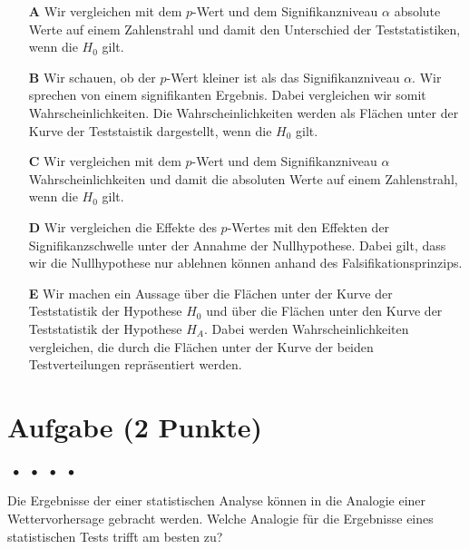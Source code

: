 \documentclass[a4paper, 9pt]{scrartcl}\usepackage[]{graphicx}\usepackage[]{xcolor}
\begin{document}
\begin{enumerate}
\item [\textbf{A} \msquare] Wir vergleichen mit dem $p$-Wert und dem Signifikanzniveau $\alpha$ absolute Werte auf einem Zahlenstrahl und damit den Unterschied der Teststatistiken, wenn die $H_0$ gilt.
\item [\textbf{B} \msquare] Wir schauen, ob der $p$-Wert kleiner ist als das Signifikanzniveau $\alpha$. Wir sprechen von einem signifikanten Ergebnis. Dabei vergleichen wir somit Wahrscheinlichkeiten. Die Wahrscheinlichkeiten werden als Flächen unter der Kurve der Teststaistik dargestellt, wenn die $H_0$ gilt.
\item [\textbf{C} \msquare] Wir vergleichen mit dem $p$-Wert und dem Signifikanzniveau $\alpha$ Wahrscheinlichkeiten und damit die absoluten Werte auf einem Zahlenstrahl, wenn die $H_0$ gilt.
\item [\textbf{D} \msquare] Wir vergleichen die Effekte des $p$-Wertes mit den Effekten der Signifikanzschwelle unter der Annahme der Nullhypothese. Dabei gilt, dass wir die Nullhypothese nur ablehnen können anhand des Falsifikationsprinzips.
\item [\textbf{E} \msquare] Wir machen ein Aussage über die Flächen unter der Kurve der Teststatistik der Hypothese $H_0$ und über die Flächen unter den Kurve der Teststatistik der Hypothese $H_A$. Dabei werden Wahrscheinlichkeiten vergleichen, die durch die Flächen unter der Kurve der beiden Testverteilungen repräsentiert werden.
\end{enumerate}

\section{Aufgabe \hfill (2 Punkte)}

\ifcollection
\begin{flushright}
\tiny\vspace{-2Ex}
\textbf{\examinhaltstart}
\exammodulemathstat $\;\bullet$
\exammodulestat $\;\bullet$
\exammodulestatbbv $\;\bullet$
\exammodulestatversuch $\;\bullet$
\exammodulebiostat
\vspace{-1Ex}
\end{flushright}
\fi




Die Ergebnisse der einer statistischen Analyse können in die Analogie einer Wettervorhersage gebracht werden. Welche Analogie für die Ergebnisse eines statistischen Tests trifft am besten zu?
\end{document}
